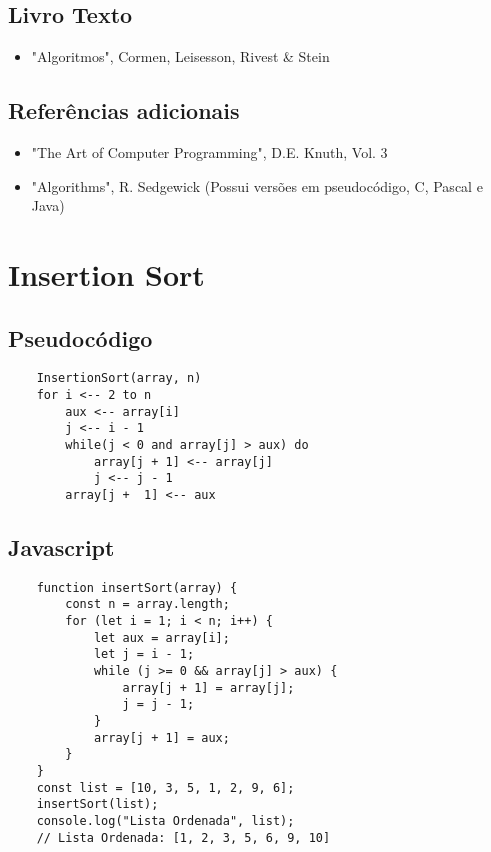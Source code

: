 \documentclass{article}
\begin{document}
\subsection{Livro Texto}


\begin{itemize}
\item \textnormal{"Algoritmos", Cormen, Leisesson, Rivest & Stein}

\end{itemize}

\subsection{Referências adicionais}

\begin{itemize}
\item \textnormal{"The Art of Computer Programming", D.E. Knuth, Vol. 3}
\item \textnormal{"Algorithms", R. Sedgewick (Possui versões em pseudocódigo, C, Pascal e Java)}
\end{itemize}





\section{Insertion Sort}

\subsection{Pseudocódigo}
\begin{lstlisting}
    InsertionSort(array, n)
    for i <-- 2 to n
        aux <-- array[i]
        j <-- i - 1
        while(j < 0 and array[j] > aux) do
            array[j + 1] <-- array[j]
            j <-- j - 1
        array[j +  1] <-- aux
\end{lstlisting}

\subsection{Javascript}

\begin{lstlisting}
    function insertSort(array) {
        const n = array.length;
        for (let i = 1; i < n; i++) {
            let aux = array[i];
            let j = i - 1;
            while (j >= 0 && array[j] > aux) {
                array[j + 1] = array[j];
                j = j - 1;
            }
            array[j + 1] = aux;
        }
    }
    const list = [10, 3, 5, 1, 2, 9, 6];
    insertSort(list);
    console.log("Lista Ordenada", list);
    // Lista Ordenada: [1, 2, 3, 5, 6, 9, 10]

\end{lstlisting}
\end{document}
